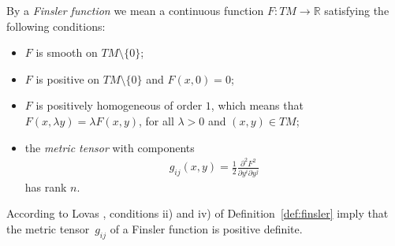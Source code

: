 \begin{Definition} \label{def:finsler}
By a \emph{Finsler function} we mean a continuous function $F: TM
\to \mathbb{R}$ satisfying the following conditions:
\begin{itemize}\itemsep=0pt
\item[i)] $F$ is smooth on $TM\setminus\{0\}$;
\item[ii)] $F$ is positive on $TM\setminus\{0\}$ and $F(x,0)=0$;
\item[iii)] $F$ is positively homogeneous of order $1$, which
means that $F(x,\lambda y)=\lambda F(x,y)$, for all $\lambda>0$
and $(x,y)\in TM$;
\item[iv)] the \emph{metric tensor} with components
\begin{gather*}
g_{ij}(x,y)=\frac{1}{2}\frac{\partial^2 F^2}{\partial y^i\partial
y^j} %
\end{gather*}
has rank $n$. \end{itemize}
\end{Definition}
According to Lovas \cite{lovas07}, conditions ii) and iv) of
Def\/inition~\ref{def:finsler}  imply that the metric tensor~$g_{ij}$ of
a Finsler function is positive def\/inite.

